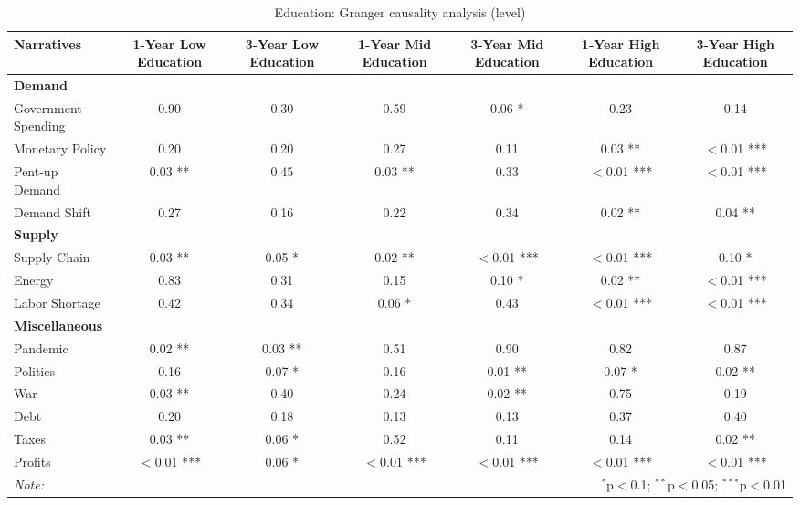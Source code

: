 \begin{sidewaystable}[ht]
\centering
\caption{Education: Granger causality analysis (level)}\label{table:granger}

\begin{tabular}{lcccccc}
\toprule
\textbf{Narratives} & \textbf{1-Year Low Education} & \textbf{3-Year Low Education} & \textbf{1-Year Mid Education} & \textbf{3-Year Mid Education} & \textbf{1-Year High Education} & \textbf{3-Year High Education} \\
\midrule
\multicolumn{7}{l}{\textbf{Demand}} \\
\midrule
Government Spending & 0.90 & 0.30 & 0.59 & 0.06 * & 0.23 & 0.14 \\
Monetary Policy & 0.20 & 0.20 & 0.27 & 0.11 & 0.03 ** & $<$0.01 *** \\
Pent-up Demand & 0.03 ** & 0.45 & 0.03 ** & 0.33 & $<$0.01 *** & $<$0.01 *** \\
Demand Shift & 0.27 & 0.16 & 0.22 & 0.34 & 0.02 ** & 0.04 ** \\
\midrule
\multicolumn{7}{l}{\textbf{Supply}} \\
\midrule
Supply Chain & 0.03 ** & 0.05 * & 0.02 ** & $<$0.01 *** & $<$0.01 *** & 0.10 * \\
Energy & 0.83 & 0.31 & 0.15 & 0.10 * & 0.02 ** & $<$0.01 *** \\
Labor Shortage & 0.42 & 0.34 & 0.06 * & 0.43 & $<$0.01 *** & $<$0.01 *** \\
\midrule
\multicolumn{7}{l}{\textbf{Miscellaneous}} \\
\midrule
Pandemic & 0.02 ** & 0.03 ** & 0.51 & 0.90 & 0.82 & 0.87 \\
Politics & 0.16 & 0.07 * & 0.16 & 0.01 ** & 0.07 * & 0.02 ** \\
War & 0.03 ** & 0.40 & 0.24 & 0.02 ** & 0.75 & 0.19 \\
Debt & 0.20 & 0.18 & 0.13 & 0.13 & 0.37 & 0.40 \\
Taxes & 0.03 ** & 0.06 * & 0.52 & 0.11 & 0.14 & 0.02 ** \\
Profits & $<$0.01 *** & 0.06 * & $<$0.01 *** & $<$0.01 *** & $<$0.01 *** & $<$0.01 *** \\
\midrule
\bottomrule
\textit{Note:}  & \multicolumn{6}{r}{$^{*}$p$<$0.1; $^{**}$p$<$0.05; $^{***}$p$<$0.01} \\
\bottomrule
\end{tabular}
\end{sidewaystable}
